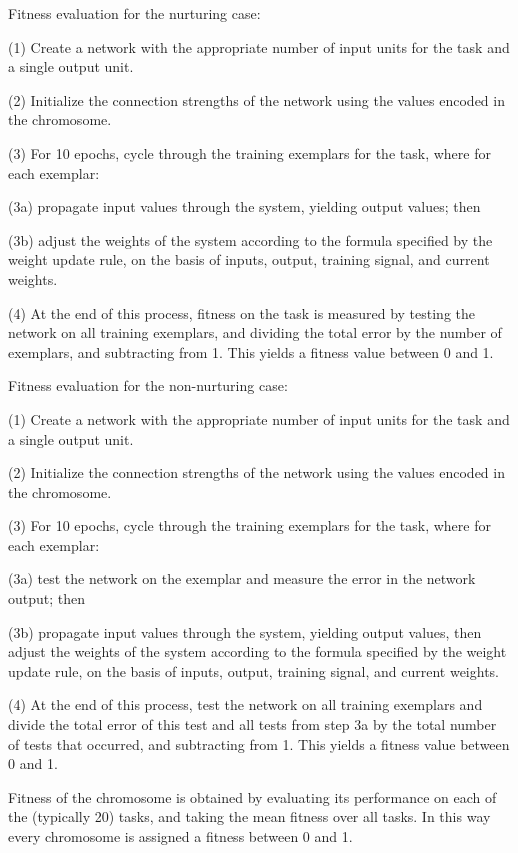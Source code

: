 \documentclass[master]{outhesis}
\begin{document}
Fitness evaluation for the nurturing case:

(1) Create a network with the appropriate number of input units for the task and a single output unit.

(2) Initialize the connection strengths of the network using the values encoded in the chromosome.

(3) For 10 epochs, cycle through the training exemplars for the task, where for each exemplar:

(3a) propagate input values through the system, yielding output values; then

(3b) adjust the weights of the system according to the formula specified by the weight update rule, on the basis of inputs, output, training signal, and current weights.

(4) At the end of this process, fitness on the task is measured by testing the network on all training exemplars, and dividing the total error by the number of exemplars, and subtracting from 1. This yields a fitness value between 0 and 1.

Fitness evaluation for the non-nurturing case:

(1) Create a network with the appropriate number of input units for the task and a single output unit.

(2) Initialize the connection strengths of the network using the values encoded in the chromosome.

(3) For 10 epochs, cycle through the training exemplars for the task, where for each exemplar:

(3a) test the network on the exemplar and measure the error in the network output; then

(3b) propagate input values through the system, yielding output values, then adjust the weights of the system according to the formula specified by the weight update rule, on the basis of inputs, output, training signal, and current weights.

(4) At the end of this process, test the network on all training exemplars and divide the total error of this test and all tests from step 3a by the total number of tests that occurred, and subtracting from 1. This yields a fitness value between 0 and 1.

Fitness of the chromosome is obtained by evaluating its performance on each of the (typically 20) tasks, and taking the mean fitness over all tasks. In this way every chromosome is assigned a fitness between 0 and 1.

\end{document}
